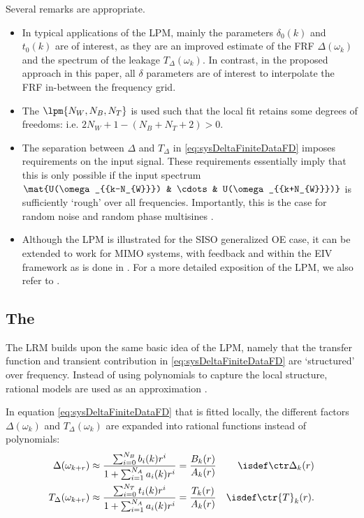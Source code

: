 Several remarks are appropriate.
\begin{itemize}
\item In typical applications of the \gls{LPM}, mainly the parameters $\delta_0(k)$ and $t_0(k)$ are of interest, as they are an improved estimate of the \gls{FRF} $\Delta(\omega_k)$ and the spectrum of the leakage $T_{\Delta}(\omega_k)$. 
In contrast, in the proposed approach in this paper, all $\delta$ parameters are of interest to interpolate the \gls{FRF} in-between the frequency grid.
\item The $\lpm{N_W,N_B,N_T}$ is used such that the local fit retains some degrees of freedoms: i.e. $2 N_W + 1  - (N_B + N_T + 2) > 0$.
\item The separation between $\Delta$ and $T_{\Delta}$ in \eqref{eq:sysDeltaFiniteDataFD} imposes requirements on the input signal. 
These requirements essentially imply that this is only possible if the input spectrum $\mat{U(\omega_{{k-N_{W}}}) & \cdots & U(\omega_{{k+N_{W}}})}$ is sufficiently `rough' over all frequencies. 
Importantly, this is the case for random noise and random phase multisines \citep{Schoukens2009LPM}.
\item Although the \gls{LPM} is illustrated for the \gls{SISO} generalized \gls{OE} case, it can be extended to work for \gls{MIMO} systems, with feedback and within the \gls{EIV} framework as is done in \citep{Pintelon2010LPM1,Pintelon2010LPM2}.
For a more detailed exposition of the \gls{LPM}, we also refer to \citep{Schoukens2006LPM, Schoukens2009LPM, Gevers2011LPM}.

\end{itemize}

\subsection{The }
The \gls{LRM} builds upon the same basic idea of the \gls{LPM}, namely that the transfer function and transient contribution in \eqref{eq:sysDeltaFiniteDataFD} are `structured' over frequency.
Instead of using polynomials to capture the local structure, rational models are used as an approximation \citep{McKelvey2012LRM}.
 
In equation \eqref{eq:sysDeltaFiniteDataFD} that is fitted locally, the different factors $\Delta(\omega_k)$ and $T_{\Delta}(\omega_k)$ are expanded into rational functions instead of polynomials:
\begin{align}
  \Delta(\omega_{k+r})     &\approx \frac{\sum_{i=0}^{N_{B}} b_{i}(k) r^{i}}{1 + \sum_{i=1}^{N_{A}} a_{i}(k) r^{i}} = \frac{B_k(r)}{A_k(r)} &\isdef \ctr\Delta_{k}(r)\label{eq:LRMTaylorSystem} \\
  T_{\Delta}(\omega_{k+r}) &\approx \frac{\sum_{i=0}^{N_{T}} t_{i}(k) r^{i}}{1 + \sum_{i=1}^{N_{A}} a_{i}(k) r^{i}}  =  \frac{T_k(r)}{A_k(r)}&\isdef \ctr{T}_{k}(r)\label{eq:LRMTaylorTransient}
  \text{.}
\end{align}

